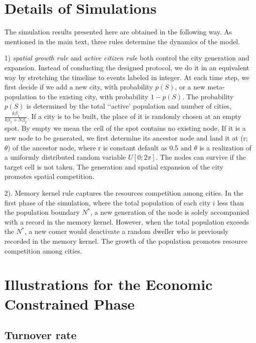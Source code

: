\documentclass[aps,prl]{revtex4-2}
\begin{document}
\section{Details of Simulations}

The simulation results presented here are obtained in the following way. As mentioned in the main text, three rules determine the dynamics of the model.

1) \textit{spatial growth rule} and \textit{active citizen rule} both control the city generation and expansion. Instead of conducting the designed protocol, we do it in an equivalent way by stretching the timeline to events labeled in integer. At each time step, we first decide if we add a new city, with probability $p(S)$, or a new meta-population to the existing city, with probability $1 - p(S)$. The probability $p(S)$ is determined by the total ‘‘active’ population and number of cities, $\frac{k\beta_1}{k\beta_1+N\beta_2}$. If a city is to be built, the place of it is randomly chosen at an empty spot. By empty we mean the cell of the spot contains no existing node. If it is a new node to be generated, we first determine its ancestor node and land it at (r; $\theta$) of the ancestor node, where r is constant default as 0.5 and $\theta$ is a realization of a uniformly distributed random variable $U[0; 2\pi]$. The nodes can survive if the target cell is not taken. The generation and spatial expansion of the city promotes spatial competition. 

2). Memory kernel rule captures the resources competition among cities. In the first phase of the simulation, where the total population of each city $i$  less than the population boundary $N^*$,  a new generation of the node is solely accompanied with a record in the memory kernel. However,  when the total population exceeds the $N^*$, a new comer would deactivate a random dweller who is previously recorded in the memory kernel. The growth of the population promotes resource competition among cities.

\section{Illustrations for the Economic Constrained Phase}

\subsection{Turnover rate} 
\end{document}
